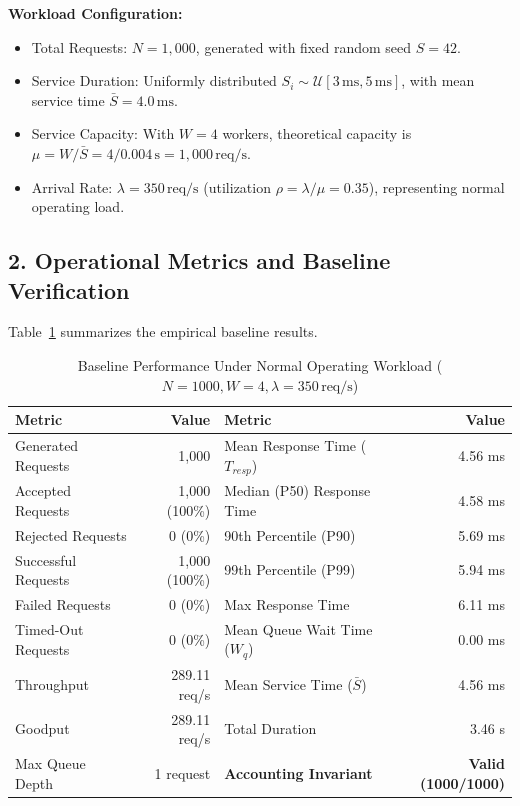 \documentclass[11pt]{article}
\begin{document}
\noindent\textbf{Workload Configuration:}
\begin{itemize}[itemsep=0.15em]
    \item Total Requests: $N = 1,000$, generated with fixed random seed $S = 42$.
    \item Service Duration: Uniformly distributed $S_i \sim \mathcal{U}[3\,\text{ms}, 5\,\text{ms}]$, with mean service time $\bar{S} = 4.0\,\text{ms}$.
    \item Service Capacity: With $W = 4$ workers, theoretical capacity is $\mu = W / \bar{S} = 4 / 0.004\,\text{s} = 1,000\,\text{req/s}$.
    \item Arrival Rate: $\lambda = 350\,\text{req/s}$ (utilization $\rho = \lambda / \mu = 0.35$), representing normal operating load.
\end{itemize}

\subsection*{2. Operational Metrics and Baseline Verification}
Table~\ref{tab:baseline_metrics} summarizes the empirical baseline results.

\begin{table}[ht]
\centering
\caption{Baseline Performance Under Normal Operating Workload ($N=1000, W=4, \lambda=350\,\text{req/s}$)}
\label{tab:baseline_metrics}
\small
\begin{tabularx}{\textwidth}{X r | X r}
\toprule
\textbf{Metric} & \textbf{Value} & \textbf{Metric} & \textbf{Value} \\
\midrule
Generated Requests & 1,000 & Mean Response Time ($T_{resp}$) & 4.56 ms \\
Accepted Requests & 1,000 (100\%) & Median (P50) Response Time & 4.58 ms \\
Rejected Requests & 0 (0\%) & 90th Percentile (P90) & 5.69 ms \\
Successful Requests & 1,000 (100\%) & 99th Percentile (P99) & 5.94 ms \\
Failed Requests & 0 (0\%) & Max Response Time & 6.11 ms \\
Timed-Out Requests & 0 (0\%) & Mean Queue Wait Time ($W_q$) & 0.00 ms \\
Throughput & 289.11 req/s & Mean Service Time ($\bar{S}$) & 4.56 ms \\
Goodput & 289.11 req/s & Total Duration & 3.46 s \\
Max Queue Depth & 1 request & \textbf{Accounting Invariant} & \textbf{Valid (1000/1000)} \\
\bottomrule
\end{tabularx}
\end{table}
\end{document}
